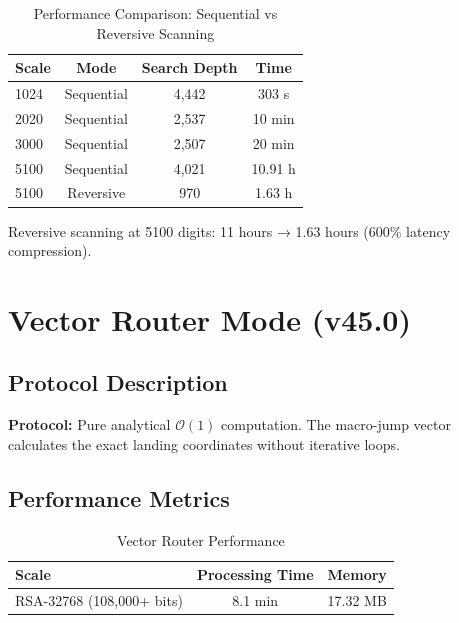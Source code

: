 \documentclass[12pt,a4paper]{article}
\begin{document}
	\begin{table}[H]
		\centering
		\caption{Performance Comparison: Sequential vs Reversive Scanning}
		\label{tab:performance}
		\begin{tabular}{l c c c}
			\toprule
			\textbf{Scale} & \textbf{Mode} & \textbf{Search Depth} & \textbf{Time} \\
			\midrule
			1024 & Sequential & 4,442 & 303 s \\
			2020 & Sequential & 2,537 & 10 min \\
			3000 & Sequential & 2,507 & 20 min \\
			5100 & Sequential & 4,021 & 10.91 h \\
			\midrule
			5100 & Reversive & 970 & 1.63 h \\
			\bottomrule
		\end{tabular}
	\end{table}
	
	\begin{verifiedbox}
		Reversive scanning at 5100 digits: 11 hours → 1.63 hours (600\% latency compression).
	\end{verifiedbox}
	
	\section{Vector Router Mode (v45.0)}
	
	\subsection{Protocol Description}
	
	\begin{protocolbox}
		\textbf{Protocol:} Pure analytical \(\mathcal{O}(1)\) computation. The macro-jump vector calculates the exact landing coordinates without iterative loops.
	\end{protocolbox}
	
	\subsection{Performance Metrics}
	
	\begin{table}[H]
		\centering
		\caption{Vector Router Performance}
		\label{tab:vector}
		\begin{tabular}{l c c}
			\toprule
			\textbf{Scale} & \textbf{Processing Time} & \textbf{Memory} \\
			\midrule
			RSA-32768 (108,000+ bits) & 8.1 min & 17.32 MB \\
			\bottomrule
		\end{tabular}
	\end{table}
	
\end{document}
